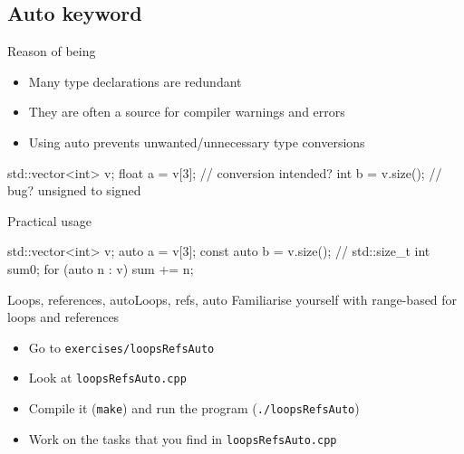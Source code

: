 \subsection[auto]{Auto keyword}

\begin{frame}[fragile]
  \begin{block}{Reason of being}
    \begin{itemize}
    \item Many type declarations are redundant
    \item They are often a source for compiler warnings and errors
    \item Using auto prevents unwanted/unnecessary type conversions
    \end{itemize}
    \begin{cppcode*}{}
      std::vector<int> v;
      float a = v[3];    // conversion intended?
      int b = v.size();  // bug? unsigned to signed
    \end{cppcode*}
  \end{block}
  \pause
  \begin{block}{Practical usage}
    \begin{cppcode*}{}
      std::vector<int> v;
      auto a = v[3];
      const auto b = v.size(); // std::size_t
      int sum{0};
      for (auto n : v) { sum += n; }
    \end{cppcode*}
  \end{block}
\end{frame}

\begin{frame}[fragile]
  \begin{exerciseWithShortcut}{Loops, references, auto}{Loops, refs, auto}
    Familiarise yourself with range-based for loops and references
    \begin{itemize}
      \item Go to \texttt{exercises/loopsRefsAuto}
      \item Look at \texttt{loopsRefsAuto.cpp}
      \item Compile it (\texttt{make}) and run the program (\texttt{./loopsRefsAuto})
      \item Work on the tasks that you find in \texttt{loopsRefsAuto.cpp}
    \end{itemize}
  \end{exerciseWithShortcut}
\end{frame}
